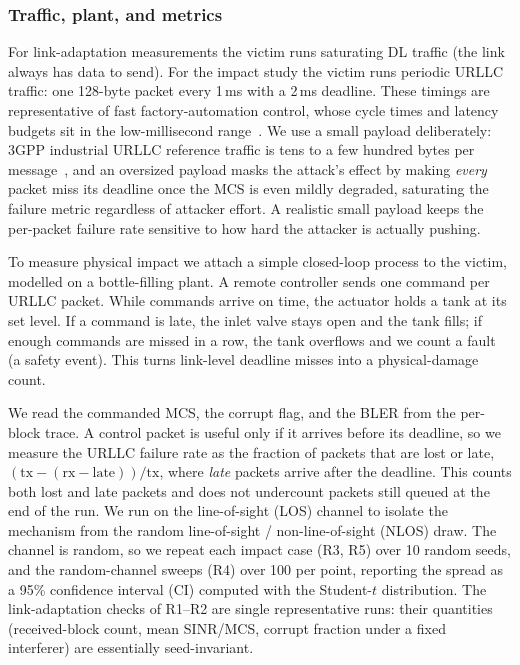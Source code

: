 \documentclass[conference]{IEEEtran}
\begin{document}
\subsubsection{Traffic, plant, and metrics}
For link-adaptation measurements the victim runs saturating DL traffic (the link always
has data to send). For the impact study the victim runs periodic URLLC traffic: one
128-byte packet every 1\,ms with a 2\,ms deadline. These timings are representative of
fast factory-automation control, whose cycle times and latency budgets sit in the
low-millisecond range~\cite{michaelides2025secure}. We use a small payload deliberately:
3GPP industrial URLLC reference traffic is tens to a few hundred bytes per
message~\cite{michaelides2025secure}, and an oversized payload masks the attack's effect
by making \emph{every} packet miss its deadline once the MCS is even mildly degraded,
saturating the failure metric regardless of attacker effort. A realistic small payload
keeps the per-packet failure rate sensitive to how hard the attacker is actually pushing.

To measure physical impact we attach a simple closed-loop process to the victim,
modelled on a bottle-filling plant. A remote controller sends one command per URLLC
packet. While commands arrive on time, the actuator holds a tank at its set level. If a
command is late, the inlet valve stays open and the tank fills; if enough commands are
missed in a row, the tank overflows and we count a fault (a safety event). This turns
link-level deadline misses into a physical-damage count.

We read the commanded MCS, the corrupt flag, and the BLER from the per-block trace. A
control packet is useful only if it arrives before its deadline, so we measure the
URLLC failure rate as the fraction of packets that are lost or late,
$(\mathrm{tx}-(\mathrm{rx}-\mathrm{late}))/\mathrm{tx}$, where \emph{late} packets
arrive after the deadline. This counts both lost and late packets and does not
undercount packets still queued at the end of the run. We run on the line-of-sight (LOS)
channel to isolate the mechanism from the random line-of-sight / non-line-of-sight (NLOS)
draw. The channel is
random, so we repeat each impact case (R3, R5) over 10 random seeds, and the
random-channel sweeps (R4) over 100 per point, reporting the spread as a 95\% confidence interval
(CI) computed with the Student-$t$ distribution. The link-adaptation checks of R1--R2 are
single representative runs: their quantities (received-block count, mean SINR/MCS, corrupt
fraction under a fixed interferer) are essentially seed-invariant.
\end{document}
